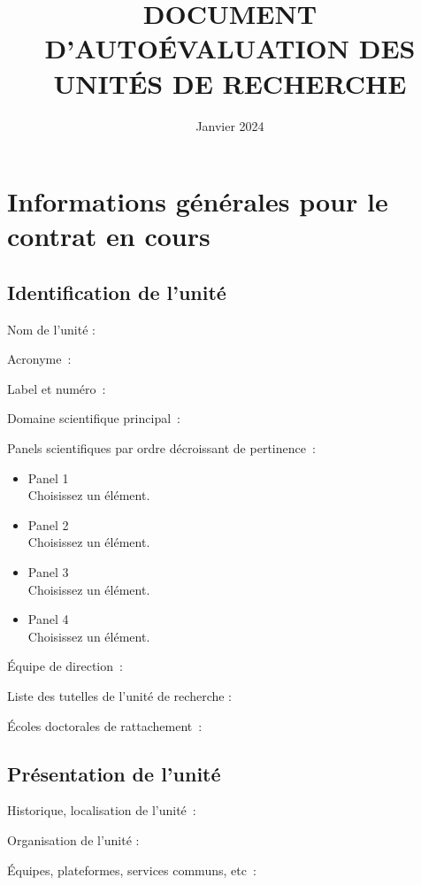 \documentclass[]{article}
\title{DOCUMENT D’AUTOÉVALUATION DES UNITÉS DE RECHERCHE}
\date{Janvier 2024}
\begin{document}

\section{Informations générales pour le contrat en cours}

\subsection{Identification de l'unité}

Nom de l'unité :

Acronyme~:

Label et numéro~:

Domaine scientifique principal~:

Panels scientifiques par ordre décroissant de pertinence~:

\begin{itemize}
\tightlist
\item
  Panel 1\\
  Choisissez un élément.
\item
  Panel 2\\
  Choisissez un élément.
\item
  Panel 3\\
  Choisissez un élément.
\item
  Panel 4\\
  Choisissez un élément.
\end{itemize}

Équipe de direction~:


Liste des tutelles de l'unité de recherche :

Écoles doctorales de rattachement~:


\subsection{Présentation de l'unité}

Historique, localisation de l'unité~:

Organisation de l'unité :

Équipes, plateformes, services communs, etc~:
\end{document}
